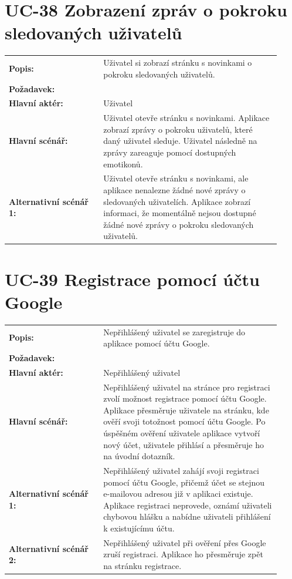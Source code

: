 \section{UC-38 Zobrazení zpráv o pokroku sledovaných uživatelů}\label{sec:uc-38}

\begin{tabular}{p{0.32\linewidth}p{0.6\linewidth}}
  \textbf{Popis:} & Uživatel si zobrazí stránku s novinkami o pokroku sledovaných uživatelů. \\
  \textbf{Požadavek:} & \nameref{sec:fp-progress-sharing} \\
  \textbf{Hlavní aktér:} & Uživatel \\
  \textbf{Hlavní scénář:} & Uživatel otevře stránku s novinkami. Aplikace zobrazí zprávy o pokroku uživatelů, které daný uživatel sleduje. Uživatel následně na zprávy zareaguje pomocí dostupných emotikonů. \\
  \textbf{Alternativní scénář 1:} & Uživatel otevře stránku s novinkami, ale aplikace nenalezne žádné nové zprávy o sledovaných uživatelích. Aplikace zobrazí informaci, že momentálně nejsou dostupné žádné nové zprávy o pokroku sledovaných uživatelů. \\
\end{tabular}

\section{UC-39 Registrace pomocí účtu Google}\label{sec:uc-39}

\begin{tabular}{p{0.32\linewidth}p{0.6\linewidth}}
  \textbf{Popis:} & Nepřihlášený uživatel se zaregistruje do aplikace pomocí účtu Google. \\
  \textbf{Požadavek:} & \nameref{sec:fp-google-auth} \\
  \textbf{Hlavní aktér:} & Nepřihlášený uživatel \\
  \textbf{Hlavní scénář:} & Nepřihlášený uživatel na stránce pro registraci zvolí možnost registrace pomocí účtu Google. Aplikace přesměruje uživatele na stránku, kde ověří svoji totožnost pomocí účtu Google. Po úspěšném ověření uživatele aplikace vytvoří nový účet, uživatele přihlásí a přesměruje ho na úvodní dotazník. \\
  \textbf{Alternativní scénář 1:} & Nepřihlášený uživatel zahájí svoji registraci pomocí účtu Google, přičemž účet se stejnou e-mailovou adresou již v aplikaci existuje. Aplikace registraci neprovede, oznámí uživateli chybovou hlášku a nabídne uživateli přihlášení k existujícímu účtu. \\
  \textbf{Alternativní scénář 2:} & Nepřihlášený uživatel při ověření přes Google zruší registraci. Aplikace ho přesměruje zpět na stránku registrace. \\
\end{tabular}


